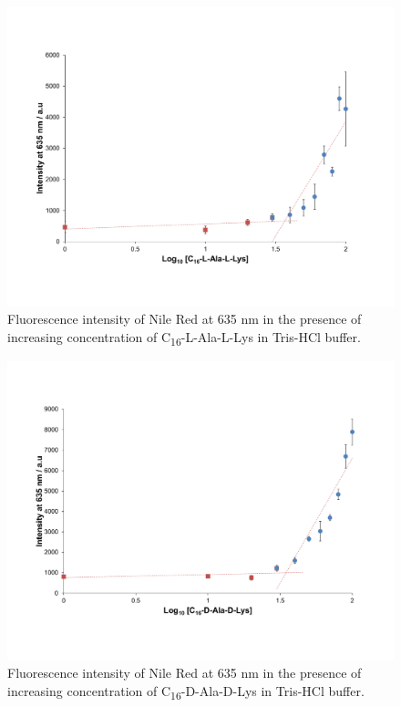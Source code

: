 \begin{figure} [ht!]
\centering
\includegraphics[scale=0.45]{Nile_Red_Assays/Nile_Red_Assay_KAT1_19.pdf}
\caption{Fluorescence intensity of Nile Red at 635 nm  in the presence of increasing concentration of C\textsubscript{16}-L-Ala-L-Lys in Tris-HCl buffer.}
\label{NR_KAT1.19}
\end{figure}

\begin{figure} [ht!]
\centering
\includegraphics[scale=0.45]{Nile_Red_Assays/Nile_Red_Assay_KAT1_35.pdf}
\caption{Fluorescence intensity of Nile Red at 635 nm  in the presence of increasing concentration of C\textsubscript{16}-D-Ala-D-Lys in Tris-HCl buffer.}
\label{NR_KAT1.35}
\end{figure}


